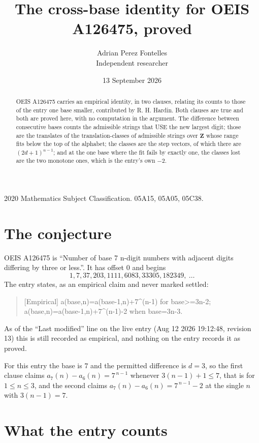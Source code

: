 \documentclass[11pt,a4paper]{article}
\title{The cross-base identity for OEIS A126475, proved}
\author{Adrian Perez Fontelles\\ \small Independent researcher}
\date{13 September 2026}
\theoremstyle{plain}
\theoremstyle{definition}
\begin{document}
\maketitle

\begin{abstract}
OEIS A126475 carries an empirical identity, in two clauses, relating its counts to those of the
entry one base smaller, contributed by R. H. Hardin. Both clauses are true and both are proved
here, with no computation in the argument. The difference between consecutive bases counts the
admissible strings that USE the new largest digit; those are the translates of the
translation-classes of admissible strings over $\mathbf{Z}$ whose range fits below the top of
the alphabet; the classes are the step vectors, of which there are $(2d+1)^{n-1}$; and at the
one base where the fit fails by exactly one, the classes lost are the two monotone ones, which
is the entry's own $-2$.
\end{abstract}

\noindent\small 2020 Mathematics Subject Classification. 05A15, 05A05, 05C38.\normalsize

\section{The conjecture}

OEIS A126475 is ``Number of base 7 n-digit numbers with adjacent digits differing by three or less.''. It has offset $0$ and begins
\[
1, 7, 37, 203, 1111, 6083, 33305, 182349,\ \dots
\]
The entry states, as an empirical claim and never marked settled:
\begin{quote}
[Empirical] a(base,n)=a(base-1,n)+7\textasciicircum{}(n-1) for base>=3n-2; a(base,n)=a(base-1,n)+7\textasciicircum{}(n-1)-2 when base=3n-3.
\end{quote}
As of the ``Last modified'' line on the live entry (Aug 12 2026 19:12:48, revision 13)
this is still recorded as empirical, and nothing on the entry records it as proved.

For this entry the base is $7$ and the permitted difference is $d=3$, so the first clause
claims $a_{7}(n)-a_{6}(n)=7^{\,n-1}$ whenever $3(n-1)+1\le7$, that is for
$1\le n\le3$, and the second claims $a_{7}(n)-a_{6}(n)=7^{\,n-1}-2$ at the single
$n$ with $3(n-1)=7$.

\section{What the entry counts}
\end{document}
